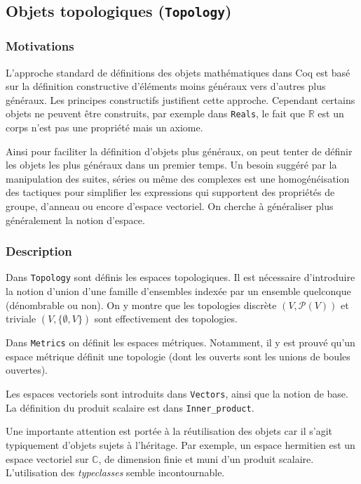 \documentclass{article}
\newcommand{\coqcode}[1]{\texttt{#1}}
\begin{document}
\subsection{Objets topologiques (\coqcode{Topology})}

\subsubsection{Motivations}

L'approche standard de définitions des objets mathématiques dans Coq est basé sur la définition constructive d'éléments moins généraux vers d'autres plus généraux. Les principes constructifs justifient cette approche. Cependant certains objets ne peuvent être construits, par exemple dans \coqcode{Reals}, le fait que $\mathbb{R}$ est un corps n'est pas une propriété mais un axiome.

Ainsi pour faciliter la définition d'objets plus généraux, on peut tenter de définir les objets les plus généraux dans un premier temps. Un besoin suggéré par la manipulation des suites, séries ou même des complexes est une homogénéisation des tactiques pour simplifier les expressions qui supportent des propriétés de groupe, d'anneau ou encore d'espace vectoriel. On cherche à généraliser plus généralement la notion d'espace.

\subsubsection{Description}

Dans \coqcode{Topology} sont définis les espaces topologiques. Il est nécessaire d'introduire la notion d'union d'une famille d'ensembles indexée par un ensemble quelconque (dénombrable ou non). On y montre que les topologies discrète $(V,\mathcal{P}(V))$ et triviale $(V,\{\emptyset,V\})$ sont effectivement des topologies.

Dans \coqcode{Metrics} on définit les espaces métriques. Notamment, il y est prouvé qu'un espace métrique définit une topologie (dont les ouverts sont les unions de boules ouvertes).

Les espaces vectoriels sont introduits dans \coqcode{Vectors}, ainsi que la notion de base. La définition du produit scalaire est dans \coqcode{Inner\_product}.

Une importante attention est portée à la réutilisation des objets car il s'agit typiquement d'objets sujets à l'héritage. Par exemple, un espace hermitien est un espace vectoriel sur $\mathbb{C}$, de dimension finie et muni d'un produit scalaire. L'utilisation des \emph{typeclasses} semble incontournable.
\end{document}
